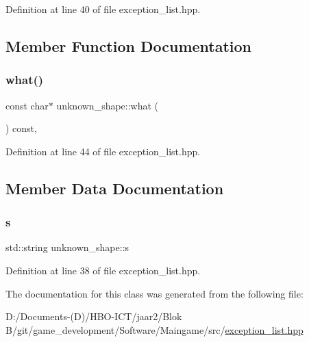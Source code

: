 Definition at line 40 of file exception\+\_\+list.\+hpp.



\subsection{Member Function Documentation}
\mbox{\label{classunknown__shape_a79e591bd483fc895aeeffccffe56ea14}} 
\subsubsection{\texorpdfstring{what()}{what()}}
{\footnotesize\ttfamily const char$\ast$ unknown\+\_\+shape\+::what (\begin{DoxyParamCaption}{ }\end{DoxyParamCaption}) const\hspace{0.3cm}{\ttfamily [inline]}, {\ttfamily [override]}}



Definition at line 44 of file exception\+\_\+list.\+hpp.



\subsection{Member Data Documentation}
\mbox{\label{classunknown__shape_a315cb57042a51070978ee5fbb8150a81}} 
\subsubsection{\texorpdfstring{s}{s}}
{\footnotesize\ttfamily std\+::string unknown\+\_\+shape\+::s\hspace{0.3cm}{\ttfamily [private]}}



Definition at line 38 of file exception\+\_\+list.\+hpp.



The documentation for this class was generated from the following file\+:\begin{DoxyCompactItemize}
\item 
D\+:/\+Documents-\/(\+D)/\+H\+B\+O-\/\+I\+C\+T/jaar2/\+Blok B/git/game\+\_\+development/\+Software/\+Maingame/src/\hyperlink{exception__list_8hpp}{exception\+\_\+list.\+hpp}\end{DoxyCompactItemize}
